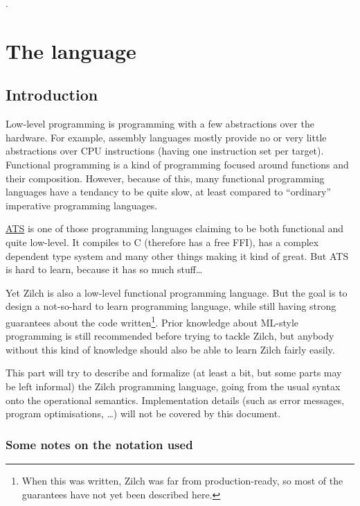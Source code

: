 .\begingroup
{}


\part{The language}\label{part:zilch}

\chapter{Introduction}\label{chap:zilch-introduction}

Low-level programming is programming with a few abstractions over the hardware.
For example, assembly languages mostly provide no or very little abstractions over CPU instructions (having one instruction set per target).
Functional programming is a kind of programming focused around functions and their composition.
However, because of this, many functional programming languages have a tendancy to be quite slow, at least compared to ``ordinary'' imperative programming languages.

\href{http://www.ats-lang.org/}{ATS} is one of those programming languages claiming to be both functional and quite low-level.
It compiles to C (therefore has a free FFI), has a complex dependent type system and many other things making it kind of great.
But ATS is hard to learn, because it has so much stuff\ldots

Yet Zilch is also a low-level functional programming language.
But the goal is to design a not-so-hard to learn programming language, while still having strong guarantees about the code written\footnote{When this was written, Zilch was far from production-ready, so most
	of the guarantees have not yet been described here.}.
Prior knowledge about ML-style programming is still recommended before trying to tackle Zilch, but anybody without this kind of knowledge should also be able to learn Zilch fairly easily.

This part will try to describe and formalize (at least a bit, but some parts may be left informal) the Zilch programming language, going from the usual syntax onto the operational semantics.
Implementation details (such as error messages, program optimisations, \ldots) will not be covered by this document.

\section*{Some notes on the notation used}\label{sec:zilch-introduction-notation}


